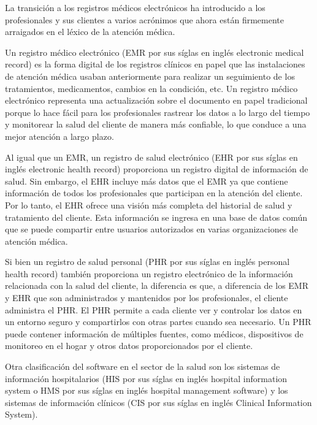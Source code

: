 La transición a los registros médicos electrónicos ha introducido a los profesionales y sus clientes a varios acrónimos que ahora están firmemente arraigados en el léxico de la atención médica.

Un registro médico electrónico (EMR por sus síglas en inglés electronic medical record) es la forma digital de los registros clínicos en papel que las instalaciones de atención médica usaban anteriormente para realizar un seguimiento de los tratamientos, medicamentos, cambios en la condición, etc. Un registro médico electrónico representa una actualización sobre el documento en papel tradicional porque lo hace fácil para los profesionales rastrear los datos a lo largo del tiempo y monitorear la salud del cliente de manera más confiable, lo que conduce a una mejor atención a largo plazo.

\vspace{1em}

Al igual que un EMR, un registro de salud electrónico (EHR por sus síglas en inglés electronic health record) proporciona un registro digital de información de salud. Sin embargo, el EHR incluye más datos que el EMR ya que contiene información de todos los profesionales que participan en la atención del cliente. Por lo tanto, el EHR ofrece una visión más completa del historial de salud y tratamiento del cliente. Esta información se ingresa en una base de datos común que se puede compartir entre usuarios autorizados en varias organizaciones de atención médica.\cite{D04}

\vspace{1em}

Si bien un registro de salud personal (PHR por sus síglas en inglés personal health record) también proporciona un registro electrónico de la información relacionada con la salud del cliente, la diferencia es que, a diferencia de los EMR y EHR que son administrados y mantenidos por los profesionales, el cliente administra el PHR. El PHR permite a cada cliente ver y controlar los datos en un entorno seguro y compartirlos con otras partes cuando sea necesario. Un PHR puede contener información de múltiples fuentes, como médicos, dispositivos de monitoreo en el hogar y otros datos proporcionados por el cliente.

\vspace{1em}

Otra clasificación del software en el sector de la salud son los sistemas de información hospitalarios (HIS por sus síglas en inglés hospital information system o HMS por sus síglas en inglés hospital management software) y los sistemas de información clínicos (CIS por sus síglas en inglés Clinical Information System). 

